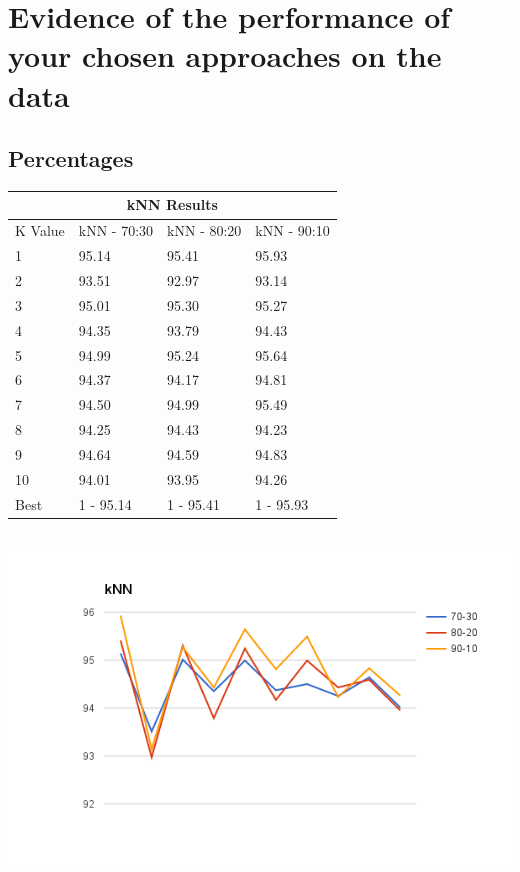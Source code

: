\documentclass[paper=a4, fontsize=11pt]{scrartcl}
\numberwithin{equation}{section}		%
\numberwithin{figure}{section}			%
\numberwithin{table}{section}				%
\begin{document}
\section{Evidence of the performance of your chosen approaches on the data}

\subsection{Percentages}

\begin{tabular}{ |p{2cm}||p{4cm}|p{4cm}|p{4cm}| }
 \hline
 \multicolumn{4}{|c|}{kNN Results} \\
 \hline
K Value & kNN - 70:30 & kNN - 80:20 & kNN - 90:10\\
 \hline
1 & 95.14 & 95.41 & 95.93 \\
2 & 93.51 & 92.97 & 93.14 \\
3 & 95.01 & 95.30 & 95.27 \\
4 & 94.35 & 93.79 & 94.43 \\
5 & 94.99 & 95.24 & 95.64 \\
6 & 94.37 & 94.17 & 94.81 \\
7 & 94.50 & 94.99 & 95.49 \\
8 & 94.25 & 94.43 & 94.23 \\
9 & 94.64 & 94.59 & 94.83 \\
10 & 94.01 & 93.95 & 94.26 \\
 \hline
 Best & 1 - 95.14 & 1 - 95.41 & 1 - 95.93 \\
 \hline
\end{tabular}
\\
\includegraphics[width=\textwidth]{knn.png}
\\
\end{document}
